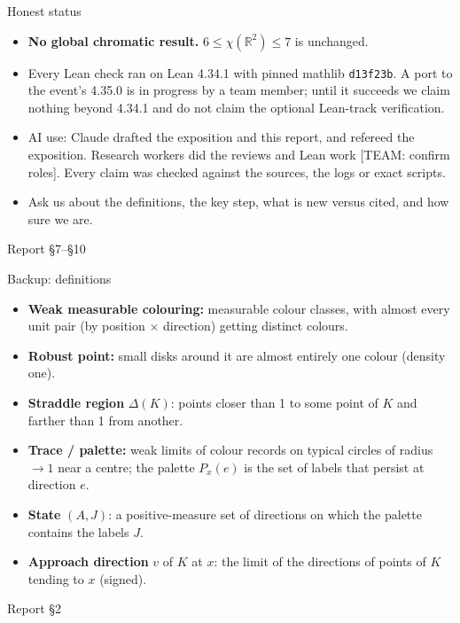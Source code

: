 \documentclass[aspectratio=169,11pt]{beamer}
\newcommand{\R}{\mathbb{R}}
\newcommand{\src}[1]{\par\vfill{\scriptsize\color{gray} Report #1}}
\begin{document}
\begin{frame}{Honest status}
\begin{itemize}
\item \textbf{No global chromatic result.} $6\le\chi(\R^2)\le7$ is unchanged.
\item Every Lean check ran on Lean 4.34.1 with pinned mathlib \texttt{d13f23b}. A port to the event's 4.35.0 is in progress by a team member; until it succeeds we claim nothing beyond 4.34.1 and do not claim the optional Lean-track verification.
\item AI use: Claude drafted the exposition and this report, and refereed the exposition. Research workers did the reviews and Lean work [TEAM: confirm roles]. Every claim was checked against the sources, the logs or exact scripts.
\item Ask us about the definitions, the key step, what is new versus cited, and how sure we are.
\end{itemize}
\src{\S7--\S10}
\end{frame}

\appendix
\begin{frame}{Backup: definitions}
\small
\begin{itemize}
\item \textbf{Weak measurable colouring:} measurable colour classes, with almost every unit pair (by position $\times$ direction) getting distinct colours.
\item \textbf{Robust point:} small disks around it are almost entirely one colour (density one).
\item \textbf{Straddle region} $\Delta(K)$: points closer than 1 to some point of $K$ and farther than 1 from another.
\item \textbf{Trace / palette:} weak limits of colour records on typical circles of radius $\to1$ near a centre; the palette $P_x(e)$ is the set of labels that persist at direction $e$.
\item \textbf{State} $(A,J)$: a positive-measure set of directions on which the palette contains the labels $J$.
\item \textbf{Approach direction} $v$ of $K$ at $x$: the limit of the directions of points of $K$ tending to $x$ (signed).
\end{itemize}
\src{\S2}
\end{frame}
\end{document}
